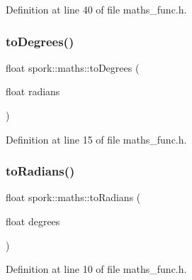 Definition at line 40 of file maths\+\_\+func.\+h.

\mbox{\label{namespacespork_1_1maths_a83529daea8730dd1694895c2e1f6049a}} 
\subsubsection{\texorpdfstring{to\+Degrees()}{toDegrees()}}
{\footnotesize\ttfamily float spork\+::maths\+::to\+Degrees (\begin{DoxyParamCaption}\item[{float}]{radians }\end{DoxyParamCaption})\hspace{0.3cm}{\ttfamily [inline]}}



Definition at line 15 of file maths\+\_\+func.\+h.

\mbox{\label{namespacespork_1_1maths_a6a8870835949f3c092e2c89a662789a6}} 
\subsubsection{\texorpdfstring{to\+Radians()}{toRadians()}}
{\footnotesize\ttfamily float spork\+::maths\+::to\+Radians (\begin{DoxyParamCaption}\item[{float}]{degrees }\end{DoxyParamCaption})\hspace{0.3cm}{\ttfamily [inline]}}



Definition at line 10 of file maths\+\_\+func.\+h.

